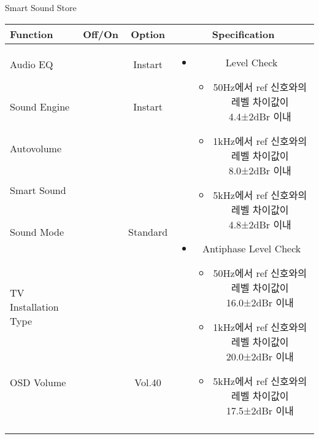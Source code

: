 \begin{frame}[t]{Smart Sound Store}
\begin{tiny}
\begin{tabular}{@{}lccc@{}}
\toprule
Function & Off/On & Option & Specification \\
\midrule
Audio EQ & \color{black}{Off} & Instart &
\multirow{10}{60mm}{
\begin{itemize}
\item Level Check
	\begin{itemize}
	\item 50Hz에서 ref 신호와의 레벨 차이값이 4.4±2dBr 이내
	\item 1kHz에서 ref 신호와의 레벨 차이값이 8.0±2dBr 이내
	\item 5kHz에서 ref 신호와의 레벨 차이값이 4.8±2dBr 이내
	\end{itemize}
\item Antiphase Level Check
	\begin{itemize}
	\item 50Hz에서 ref 신호와의 레벨 차이값이 16.0±2dBr 이내
	\item 1kHz에서 ref 신호와의 레벨 차이값이 20.0±2dBr 이내
	\item 5kHz에서 ref 신호와의 레벨 차이값이 17.5±2dBr 이내
	\end{itemize}
\end{itemize}
} \\
Sound Engine & \color{blue}{On} & Instart & \\
Autovolume & \color{black}{Off} & & \\
Smart Sound & \color{blue}{On} & & \\
Sound Mode & \color{blue}{On} & Standard & \\
TV Installation Type & \color{blue}{On} & \color{black}{Standtype1} & \\
OSD Volume & \color{blue}{On} & Vol.40 & \\
& & & \\
& & & \\
& & & \\
& & & \\\midrule
\end{tabular}
\end{tiny}

\end{frame}
